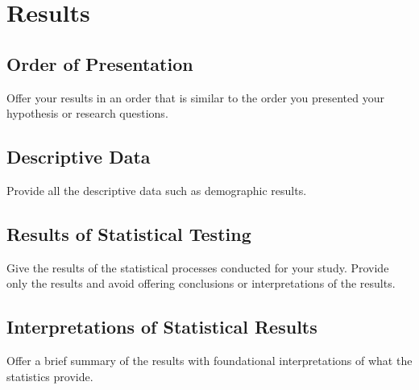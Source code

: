 \chapter{Results}

\section{Order of Presentation}
Offer your results in an order that is similar to the order you presented your hypothesis or research questions.

\section{Descriptive Data}
Provide all the descriptive data such as demographic results.

\section{Results of Statistical Testing}
Give the results of the statistical processes conducted for your study. Provide only the results and avoid offering conclusions or interpretations of the results.

\section{Interpretations of Statistical Results}
Offer a brief summary of the results with foundational interpretations of what the statistics provide.
